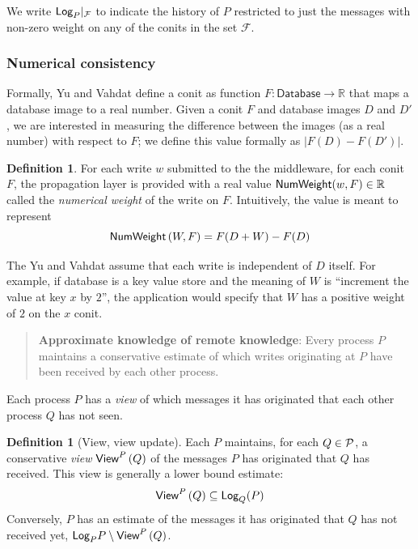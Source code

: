 \documentclass[]             %
{NASA}                       %
\theoremstyle{definition}
\newtheorem{definition}[theorem]{Definition}
\begin{document}
We write $\textsf{Log}_{P}|_\mathcal{F}$ to indicate the history of $P$
restricted to just the messages with non-zero weight on any of the
conits in the set $\mathcal{F}$.

\subsubsection{Numerical consistency}
\label{sssec:conit-numerical-consistency}
Formally, Yu and Vahdat define a conit as function
$F\colon \mathsf{Database} \to \mathbb{R}$ that maps a database image
to a real number. Given a conit $F$ and database images $D$ and $D'$,
we are interested in measuring the difference between the images (as a
real number) with respect to $F$; we define this value formally as
$|F(D) - F(D')|$.

\begin{definition}
  For each write $w$ submitted to the the middleware, for each conit
  $F$, the propagation layer is provided with a real value
  $\mathsf{NumWeight}(w, F) \in \mathbb{R}$ called the \emph{numerical weight}
  of the write on $F$.  Intuitively, the value is meant to represent
  \[ \mathsf{NumWeight}\left(W, F\right) = F(D + W) - F(D) \]
\end{definition}
The Yu and Vahdat assume that each write is independent of $D$ itself. For
example, if database is a key value store and the meaning of $W$ is
``increment the value at key $x$ by $2$'', the application would
specify that $W$ has a positive weight of $2$ on the $x$ conit.

\begin{quote}
  \textbf{Approximate knowledge of remote knowledge}: Every process
  $P$ maintains a conservative estimate of which writes originating at
  $P$ have been received by each other process.
\end{quote}

Each process $P$ has a \emph{view} of which messages it has originated
that each other process $Q$ has not seen.

\begin{definition}[View, view update]
  Each $P$ maintains, for each $Q \in \mathcal{P}$, a conservative
  \emph{view} $\textsf{View}^{P}\left(Q\right)$ of the messages $P$ has originated that
  $Q$ has received. This view is generally a lower bound estimate:
  \[\textsf{View}^{P}\left(Q\right) \subseteq \textsf{Log}_{Q}(P) \]
  Conversely, $P$ has an estimate of the messages it has originated
  that $Q$ has not received yet, $\textsf{Log}_{P}{P} \setminus \textsf{View}^{P}\left(Q\right)$.
\end{definition}
\end{document}
